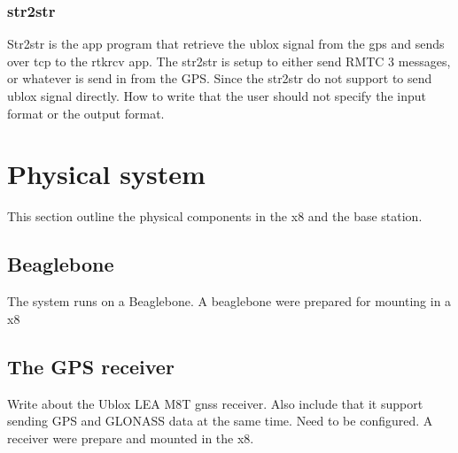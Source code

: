 \subsubsection{str2str}
Str2str is the app program that retrieve the ublox signal from the gps and sends over tcp to the rtkrcv app. The str2str is setup to either send RMTC 3 messages, or whatever is send in from the GPS. Since the str2str do not support to send ublox signal directly. How to write that the user should not specify the input format or the output format.
\section{Physical system}
This section outline the physical components in the x8 and the base station.
\subsection{Beaglebone}
The system runs on a Beaglebone. A beaglebone were prepared for mounting in a x8
\subsection{The GPS receiver}
Write about the Ublox LEA M8T gnss receiver. Also include that it support sending GPS and GLONASS data at the same time. Need to be configured. A receiver were prepare and mounted in the x8.
\cleardoublepage